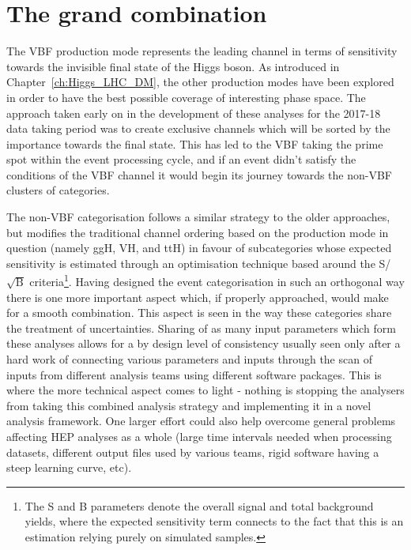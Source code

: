 \section{The grand combination}

\hspace{10pt} The VBF production mode represents the leading channel in terms of sensitivity towards the invisible final state of the Higgs boson. As introduced in Chapter~\ref{ch:Higgs_LHC_DM}, the other production modes have been explored in order to have the best possible coverage of interesting phase space. The approach taken early on in the development of these analyses for the 2017-18 data taking period was to create exclusive channels which will be sorted by the importance towards the final state. This has led to the VBF taking the prime spot within the event processing cycle, and if an event didn't satisfy the conditions of the VBF channel it would begin its journey towards the non-VBF clusters of categories. 

\hspace{10pt} The non-VBF categorisation follows a similar strategy to the older approaches, but modifies the traditional channel ordering based on the production mode in question (namely ggH, VH, and ttH) in favour of subcategories whose expected sensitivity is estimated through an optimisation technique based around the S/$\sqrt{\text{B}}$ criteria\footnote{The S and B parameters denote the overall signal and total background yields, where the expected sensitivity term connects to the fact that this is an estimation relying purely on simulated samples.}. Having designed the event categorisation in such an orthogonal way there is one more important aspect which, if properly approached, would make for a smooth combination. This aspect is seen in the way these categories share the treatment of uncertainties. Sharing of as many input parameters which form these analyses allows for a by design level of consistency usually seen only after a hard work of connecting various parameters and inputs through the scan of inputs from different analysis teams using different software packages. This is where the more technical aspect comes to light - nothing is stopping the analysers from taking this combined analysis strategy and implementing it in a novel analysis framework. One larger effort could also help overcome general problems affecting HEP analyses as a whole (large time intervals needed when processing datasets, different output files used by various teams, rigid software having a steep learning curve, etc).



